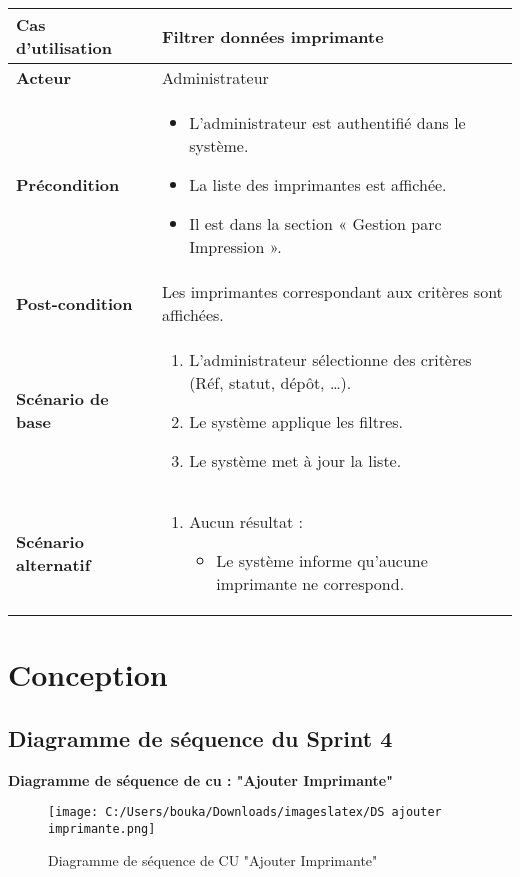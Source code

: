 \documentclass[a4paper,11pt]{report}
\begin{document}
\begin{tabularx}{\textwidth}{|>{\bfseries}l|X|}
\hline
Cas d’utilisation    & Filtrer données imprimante \\
\hline
Acteur               & Administrateur \\
\hline
Précondition         &
\begin{itemize}[left=0pt]
  \item L’administrateur est authentifié dans le système.
  \item La liste des imprimantes est affichée.
  \item Il est dans la section « Gestion parc Impression ».
\end{itemize} \\
\hline
Post-condition       & Les imprimantes correspondant aux critères sont affichées. \\
\hline
Scénario de base     &
\begin{enumerate}[left=0pt]
  \item L’administrateur sélectionne des critères (Réf, statut, dépôt, …).
  \item Le système applique les filtres.
  \item Le système met à jour la liste.
\end{enumerate} \\
\hline
Scénario alternatif   &
\begin{enumerate}[label=\arabic*.a,wide=0pt]
  \item Aucun résultat :
    \begin{itemize}[left=1em]
      \item Le système informe qu’aucune imprimante ne correspond.
    \end{itemize}
\end{enumerate} \\
\hline
\end{tabularx}

\section{Conception}
\subsection{Diagramme de séquence du Sprint 4}

\textbf{Diagramme de séquence de cu : "Ajouter Imprimante" }


\begin{figure}[H]
  \centering
  \texttt{[image: C:/Users/bouka/Downloads/imageslatex/DS ajouter imprimante.png]}
  \caption{Diagramme de séquence de CU "Ajouter Imprimante"}
  \label{fig:clone-result}
\end{figure}
\end{document}
